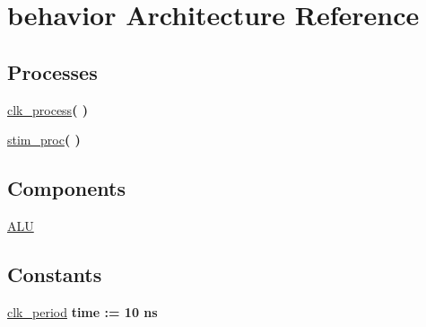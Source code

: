 \hypertarget{class_a_l_u__tb_1_1behavior}{\section{behavior \-Architecture \-Reference}
\label{class_a_l_u__tb_1_1behavior}
}
\*
\*
\subsection*{\-Processes}
 \begin{DoxyCompactItemize}
\item 
\hyperlink{class_a_l_u__tb_1_1behavior_ac5bb218131b813f7908ec89476b31fca}{clk\-\_\-process}{\bfseries  (  )}
\item 
\hyperlink{class_a_l_u__tb_1_1behavior_ad2efa6785cff833c341e27596b21aeb5}{stim\-\_\-proc}{\bfseries  (  )}
\end{DoxyCompactItemize}
\subsection*{\-Components}
 \begin{DoxyCompactItemize}
\item 
\hyperlink{class_a_l_u__tb_1_1behavior_a25a9958c95570c64e56bdc97ad3dc777}{\-A\-L\-U}  {\bfseries }  
\end{DoxyCompactItemize}
\subsection*{\-Constants}
 \begin{DoxyCompactItemize}
\item 
\hyperlink{class_a_l_u__tb_1_1behavior_a76ecbb36f10e5f10094102e221f37f1b}{clk\-\_\-period} {\bfseries time  \-:=  10  ns } 
\end{DoxyCompactItemize}
